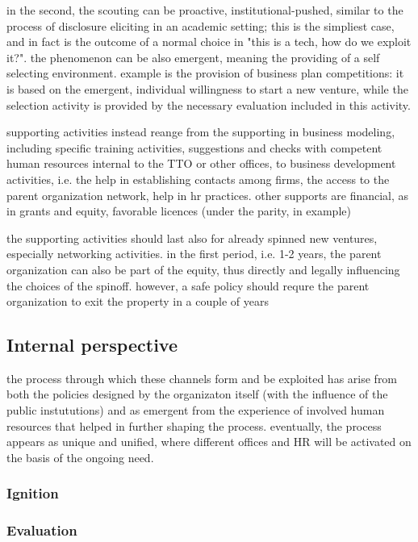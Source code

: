 in the second, the scouting can be proactive, institutional-pushed, similar to the process of disclosure eliciting in an academic setting; this is the simpliest case, and in fact is the outcome of a normal choice in "this is a tech, how do we exploit it?". the phenomenon can be also emergent, meaning the providing of a self selecting environment. example is the provision of business plan competitions: it is based on the emergent, individual willingness to start a new venture, while the selection activity is provided by the necessary evaluation included in this activity.

supporting activities instead reange from the supporting in business modeling, including specific training activities, suggestions and checks with competent human resources internal to the TTO or other offices, to business development activities, i.e. the help in establishing contacts among firms, the access to the parent organization network, help in hr practices. other supports are financial, as in grants and equity, favorable licences (under the parity, in example)

the supporting activities should last also for already spinned new ventures, especially networking activities. in the first period, i.e. 1-2 years, the parent organization can also be part of the equity, thus directly and legally influencing the choices of the spinoff. however, a safe policy should requre the parent organization to exit the property in a couple of years

\subsection{Internal perspective}

the process through which these channels form and be exploited has arise from both the policies designed by the organizaton itself (with the influence of the public instututions) and as emergent from the experience of involved human resources that helped in further shaping the process. eventually, the process appears as unique and unified, where different offices and HR will be activated on the basis of the ongoing need. 

\subsubsection{Ignition}
\subsubsection{Evaluation}
